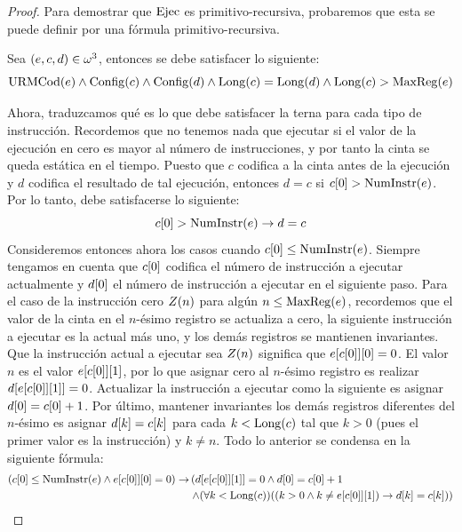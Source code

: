 \begin{proof}
	Para demostrar que $\EJECUCION$ es primitivo-recursiva, probaremos que esta se puede definir por una fórmula primitivo-recursiva.

	Sea $\pa*{e, c, d}\in\omega^{3}$, entonces se debe satisfacer lo siguiente:
	\[
		\URMCODIGO\pa*{e}\land\CONFIGURACIONES\pa*{c}\land\CONFIGURACIONES\pa*{d}\land\LONGITUD\pa*{c} =\LONGITUD\pa*{d}\land\LONGITUD\pa*{c} >\MAXREGISTRO\pa*{e}
	\]

	Ahora, traduzcamos qué es lo que debe satisfacer la terna para cada tipo de instrucción. Recordemos que no tenemos nada que ejecutar si el valor de la ejecución en cero es mayor al número de instrucciones, y por tanto la cinta se queda estática en el tiempo. Puesto que $c$ codifica a la cinta antes de la ejecución y $d$ codifica el resultado de tal ejecución, entonces $d = c$ si $c\bra*{0} >\NUMINSTRUCCIONES\pa*{e}$. Por lo tanto, debe satisfacerse lo siguiente:
	\[
		c\bra*{0} >\NUMINSTRUCCIONES\pa*{e}\to d = c
	\]
	Consideremos entonces ahora los casos cuando $c\bra*{0}\leq\NUMINSTRUCCIONES\pa*{e}$. Siempre tengamos en cuenta que $c\bra*{0}$ codifica el número de instrucción a ejecutar actualmente y $d\bra*{0}$ el número de instrucción a ejecutar en el siguiente paso. Para el caso de la instrucción cero $Z\pa*{n}$ para algún $n\leq\MAXREGISTRO\pa*{e}$, recordemos que el valor de la cinta en el $n$-ésimo registro se actualiza a cero, la siguiente instrucción a ejecutar es la actual más uno, y los demás registros se mantienen invariantes. Que la instrucción actual a ejecutar sea $Z\pa*{n}$ significa que $e\bra*{c\bra*{0}}\bra*{0} = 0$. El valor $n$ es el valor $e\bra*{c\bra*{0}}\bra*{1}$, por lo que asignar cero al $n$-ésimo registro es realizar $d\bra*{e\bra*{c\bra*{0}}\bra*{1}} = 0$. Actualizar la instrucción a ejecutar como la siguiente es asignar $d\bra*{0} = c\bra*{0} + 1$. Por último, mantener invariantes los demás registros diferentes del $n$-ésimo es asignar $d\bra*{k} = c\bra*{k}$ para cada $k <\LONGITUD\pa*{c}$ tal que $k > 0$ (pues el primer valor es la instrucción) y $k\neq n$. Todo lo anterior se condensa en la siguiente fórmula:
	\begin{align*}
		\pa*{c\bra*{0}\leq\NUMINSTRUCCIONES\pa*{e}\land e\bra*{c\bra*{0}}\bra*{0} = 0}\to&\left(d\bra*{e\bra*{c\bra*{0}}\bra*{1}} = 0\land d\bra*{0} = c\bra*{0} + 1\right.\\
		&\left.\land\pa*{\forall k <\LONGITUD\pa*{c}}\pa*{\pa*{k > 0\land k\neq e\bra*{c\bra*{0}}\bra*{1}}\to d\bra*{k} = c\bra*{k}}\right)
	\end{align*}


\end{proof}
